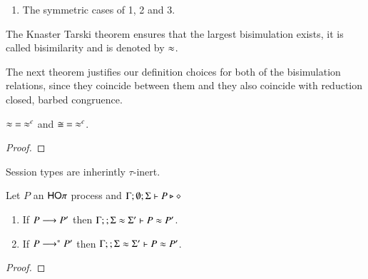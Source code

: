 \begin{definition}[Bisimulation]
\begin{enumerate}
		\item	The symmetric cases of 1, 2 and 3.
	\end{enumerate}
	The Knaster Tarski theorem ensures that the largest bisimulation exists, it is called bisimilarity and is denoted by $\approx$.
\end{definition}

The next theorem justifies our definition choices
for both of the bisimulation relations, since
they coincide between them and they also
coincide with reduction closed, barbed congruence.

\begin{theorem}[Coincidence]\rm
	\label{the:coincidence}
	$\approx\ =\ \approx^{c}$ and $\cong\ =\ \approx^{c}$.
\end{theorem}

\begin{proof}
\end{proof}

Session types are inherintly $\tau$-inert.

\begin{lemma}
	\label{lem:tau_inert}
	Let $P$ an $\mathsf{HO}\pi$ process
	and $\Gamma; \emptyset; \Sigma \vdash P \triangleright \diamond$
	\begin{enumerate}
		\item	If $P \longrightarrow P'$ then $\Gamma; \empty; \Sigma \wb \Sigma' \proves P \wb P'$.
		\item	If $P \longrightarrow^* P'$ then $\Gamma; \empty; \Sigma \wb \Sigma' \proves P \wb P'$.
	\end{enumerate}
\end{lemma}

\begin{proof}
\end{proof}


